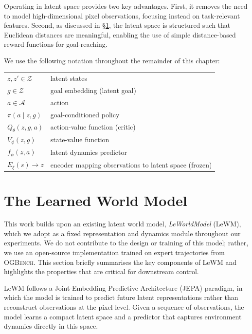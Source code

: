 Operating in latent space provides two key advantages. First, it removes the
need to model high-dimensional pixel observations, focusing instead on
task-relevant features. Second, as discussed in \S\ref{sec:lewm-bg}, the latent
space is structured such that Euclidean distances are meaningful, enabling the
use of simple distance-based reward functions for goal-reaching.

\medskip

\noindent
We use the following notation throughout the remainder of this chapter:
\medskip

\noindent
\begin{tabular}{ll}
$z, z' \in \mathcal{Z}$ & latent states \\
$g \in \mathcal{Z}$ & goal embedding (latent goal) \\
$a \in \mathcal{A}$ & action \\
$\pi(a \mid z, g)$ & goal-conditioned policy \\
$Q_\theta(z, g, a)$ & action-value function (critic) \\
$V_\phi(z, g)$ & state-value function \\
$f_\psi(z, a)$ & latent dynamics predictor \\
$E_\xi(s) \to z$ & encoder mapping observations to latent space (frozen) \\
\end{tabular}

\section{The Learned World Model}
\label{sec:lewm-bg}

This work builds upon an existing latent world model, \emph{LeWorldModel}
(LeWM), which we adopt as a fixed representation and dynamics module
throughout our experiments. We do not contribute to the design or training
of this model; rather, we use an open-source implementation trained on
expert trajectories from \textsc{OGBench}. This section briefly summarises
the key components of LeWM and highlights the properties that are critical
for downstream control.

LeWM follows a Joint-Embedding Predictive Architecture (JEPA)
paradigm, in which the model is trained to predict future latent
representations rather than reconstruct observations at the pixel level.
Given a sequence of observations, the model learns a compact latent space
and a predictor that captures environment dynamics directly in this space.

